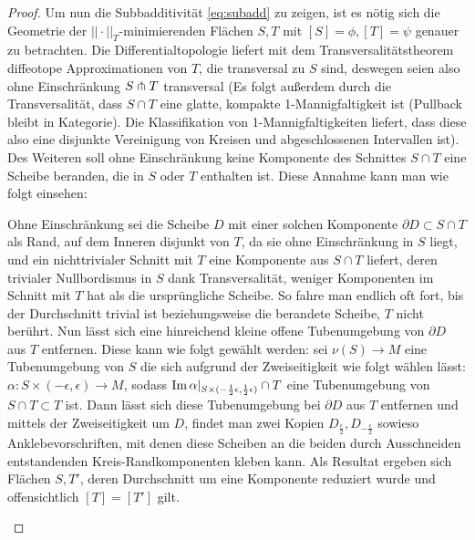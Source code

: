 \begin{proof}
            Um nun die Subbadditivität \ref{eq:subadd} zu zeigen, ist es nötig sich die Geometrie der $||\cdot||_T$-minimierenden Flächen $S,T$ mit $[S]=\phi, [T]=\psi$ genauer zu betrachten. Die Differentialtopologie liefert mit dem Transversalitätstheorem diffeotope Approximationen von $T$, die transversal zu $S$ sind, deswegen seien also ohne Einschränkung $S \pitchfork T$ transversal (Es folgt außerdem durch die Transversalität, dass $S\cap T$ eine glatte, kompakte 1-Mannigfaltigkeit ist (Pullback bleibt in Kategorie). Die Klassifikation von 1-Mannigfaltigkeiten liefert, dass diese also eine disjunkte Vereinigung von Kreisen und abgeschlossenen Intervallen ist). Des Weiteren soll ohne Einschränkung keine Komponente des Schnittes $S\cap T$  eine Scheibe beranden, die in $S$ oder $T$ enthalten ist. Diese Annahme kann man wie folgt einsehen:\\
            \begin{window}
                Ohne Einschränkung sei die Scheibe $D$ mit einer solchen Komponente $\partial D \subset S \cap T$ als Rand, auf dem Inneren disjunkt von $T$, da sie ohne Einschränkung in $S$ liegt, und ein nichttrivialer Schnitt mit $T$ eine Komponente aus $S\cap T$ liefert, deren trivialer Nullbordismus in $S$ dank Transversalität, weniger Komponenten im Schnitt mit $T$ hat als die ursprüngliche Scheibe. So fahre man endlich oft fort, bis der Durchschnitt trivial ist beziehungsweise die berandete Scheibe, $T$ nicht berührt. Nun lässt sich eine hinreichend kleine offene Tubenumgebung von $\partial D$ aus $T$ entfernen. Diese kann wie folgt gewählt werden: sei $\nu(S) \to M$ eine Tubenumgebung von $S$ die sich aufgrund der Zweiseitigkeit wie folgt wählen lässt: $\alpha: S \times (-\epsilon,\epsilon) \to M$, sodass $\operatorname{Im}\alpha|_{S\times (-\frac 12\epsilon,\frac 12 \epsilon)} \cap T$ eine Tubenumgebung von $S\cap T \subset T$ ist. Dann lässt sich diese Tubenumgebung bei $\partial D$ aus $T$ entfernen und mittels der Zweiseitigkeit um $D$, findet man zwei Kopien $D_{\frac \epsilon 2}, D_{-\frac \epsilon 2}$ sowieso Anklebevorschriften, mit denen diese Scheiben an die beiden durch Ausschneiden entstandenden Kreis-Randkomponenten kleben kann. Als Resultat ergeben sich Flächen $S,T'$, deren Durchschnitt um eine Komponente reduziert wurde und offensichtlich $[T]=[T']$ gilt. \\
           \end{window}

\end{proof}
